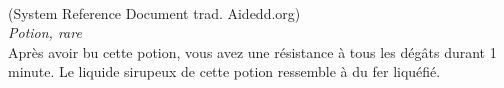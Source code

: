 \\
{\small (System Reference Document trad. Aidedd.org)}\\
{\small \it Potion, rare}\\
Après avoir bu cette potion, vous avez une résistance à tous les dégâts durant 1 minute. Le liquide sirupeux de cette potion ressemble à du fer liquéfié. \\

